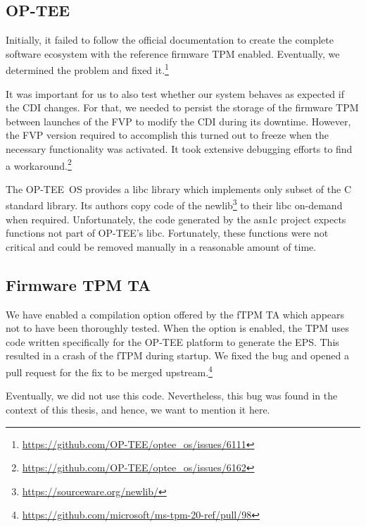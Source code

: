 \subsection{OP-TEE}


Initially, it failed to follow the official documentation to create the complete software ecosystem with the reference firmware TPM enabled.
Eventually, we determined the problem and fixed it.\footnote{\url{https://github.com/OP-TEE/optee_os/issues/6111}}


It was important for us to also test whether our system behaves as expected if the CDI changes.
For that, we needed to persist the storage of the firmware TPM between launches of the FVP to modify the CDI during its downtime.
However, the FVP version required to accomplish this turned out to freeze when the necessary functionality was activated.
It took extensive debugging efforts to find a workaround.\footnote{\url{https://github.com/OP-TEE/optee_os/issues/6162}}

The OP-TEE~OS provides a libc library which implements only subset of the C standard library.
Its authors copy code of the newlib\footnote{\url{https://sourceware.org/newlib/}} to their libc on-demand when required.
Unfortunately, the code generated by the asn1c project expects functions not part of OP-TEE's libc.
Fortunately, these functions were not critical and could be removed manually in a reasonable amount of time.

\subsection{Firmware TPM TA}

We have enabled a compilation option offered by the fTPM TA which appears not to have been thoroughly tested.
When the option is enabled, the TPM uses code written specifically for the OP-TEE platform to generate the EPS\@.
This resulted in a crash of the fTPM during startup.
We fixed the bug and opened a pull request for the fix to be merged upstream.\footnote{\url{https://github.com/microsoft/ms-tpm-20-ref/pull/98}}

Eventually, we did not use this code.
Nevertheless, this bug was found in the context of this thesis, and hence, we want to mention it here.
